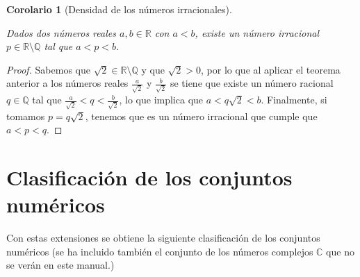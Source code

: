 \documentclass[
  a4paper,
]{scrreport}
\theoremstyle{definition}
\theoremstyle{plain}
\theoremstyle{plain}
\theoremstyle{definition}
\theoremstyle{definition}
\theoremstyle{plain}
\newtheorem{corollary}{Corolario}[chapter]
\theoremstyle{remark}
\begin{document}
\begin{corollary}[Densidad de los números
irracionales]\protect\hypertarget{cor-densidad-irracionales}{}\label{cor-densidad-irracionales}

Dados dos números reales \(a,b\in \mathbb{R}\) con \(a<b\), existe un
número irracional \(p\in \mathbb{R}\setminus \mathbb{Q}\) tal que
\(a<p<b\).

\end{corollary}

\begin{tcolorbox}[enhanced jigsaw, breakable, title=\textcolor{quarto-callout-note-color}{\faInfo}\hspace{0.5em}{Demostración}, toprule=.15mm, coltitle=black, arc=.35mm, rightrule=.15mm, colframe=quarto-callout-note-color-frame, colbacktitle=quarto-callout-note-color!10!white, toptitle=1mm, titlerule=0mm, leftrule=.75mm, opacityback=0, colback=white, bottomrule=.15mm, bottomtitle=1mm, left=2mm, opacitybacktitle=0.6]

\begin{proof}

Sabemos que \(\sqrt{2}\in \mathbb{R}\setminus\mathbb{Q}\) y que
\(\sqrt{2}>0\), por lo que al aplicar el teorema anterior a los números
reales \(\frac{a}{\sqrt{2}}\) y \(\frac{b}{\sqrt{2}}\) se tiene que
existe un número racional \(q\in\mathbb{Q}\) tal que
\(\frac{a}{\sqrt{2}}<q<\frac{b}{\sqrt{2}}\), lo que implica que
\(a<q\sqrt{2}<b\). Finalmente, si tomamos \(p=q\sqrt{2}\), tenemos que
es un número irracional que cumple que \(a<p<q\).

\end{proof}

\end{tcolorbox}

\hypertarget{clasificaciuxf3n-de-los-conjuntos-numuxe9ricos}{%
\section{Clasificación de los conjuntos
numéricos}\label{clasificaciuxf3n-de-los-conjuntos-numuxe9ricos}}

Con estas extensiones se obtiene la siguiente clasificación de los
conjuntos numéricos (se ha incluido también el conjunto de los números
complejos \(\mathbb{C}\) que no se verán en este manual.)
\end{document}
